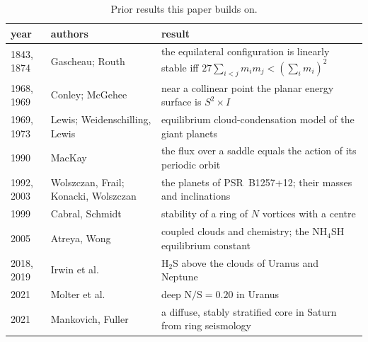 \documentclass[11pt]{article}
\theoremstyle{definition}\newtheorem{definition}[theorem]{Definition}
\theoremstyle{remark}\newtheorem{remark}[theorem]{Remark}
\begin{document}
\begin{table}[!htb]\centering\small
\begin{tabular}{@{}l>{\raggedright\arraybackslash}p{4.6cm}>{\raggedright\arraybackslash}p{8.0cm}@{}}\toprule
year & authors & result\\\midrule
1843, 1874 & Gascheau; Routh \cite{Gascheau,Routh} & the equilateral configuration is linearly stable iff $27\sum_{i<j}m_im_j<(\sum_im_i)^2$\\
1968, 1969 & Conley; McGehee \cite{Conley,McGehee} & near a collinear point the planar energy surface is $S^2\times I$\\
1969, 1973 & Lewis; Weidenschilling, Lewis \cite{Lewis1969,WL73} & equilibrium cloud-condensation model of the giant planets\\
1990 & MacKay \cite{MacKay} & the flux over a saddle equals the action of its periodic orbit\\
1992, 2003 & Wolszczan, Frail; Konacki, Wolszczan \cite{WF92,KW03} & the planets of PSR~B1257+12; their masses and inclinations\\
1999 & Cabral, Schmidt \cite{Cabral} & stability of a ring of $N$ vortices with a centre\\
2005 & Atreya, Wong \cite{AtreyaWong} & coupled clouds and chemistry; the NH$_4$SH equilibrium constant\\
2018, 2019 & Irwin et al.\ \cite{Irwin2018,Irwin2019a} & H$_2$S above the clouds of Uranus and Neptune\\
2021 & Molter et al.\ \cite{Molter2021} & deep $\mathrm{N/S}=0.20$ in Uranus\\
2021 & Mankovich, Fuller \cite{MankovichFuller} & a diffuse, stably stratified core in Saturn from ring seismology\\\bottomrule
\end{tabular}
\caption{Prior results this paper builds on.}\label{tab:prior}
\end{table}
\end{document}
